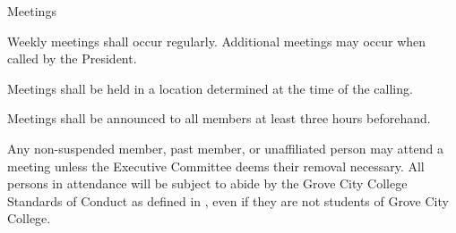 {
	\begin{article}{Meetings}
		\item Weekly meetings shall occur regularly. Additional meetings may occur when called by the President.
		\item Meetings shall be held in a location determined at the time of the calling.
		\item Meetings shall be announced to all members at least three hours beforehand.
		\item Any non-suspended member, past member, or unaffiliated person may attend a meeting unless the Executive Committee deems their removal necessary. All persons in attendance will be subject to abide by the Grove City College Standards of Conduct as defined in \crimson, even if they are not students of Grove City College.
	\end{article}
}